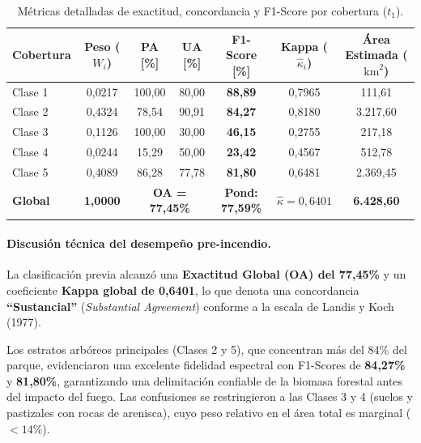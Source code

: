 \documentclass[12pt]{article}
\begin{document}
\begin{table}[H]
    \centering
    \caption{Métricas detalladas de exactitud, concordancia y F1-Score por cobertura ($t_1$).}
    \label{tab:metricas_precision_clase}
    \small
    \begin{tabular}{@{}lcccccc@{}}
        \toprule
        \textbf{Cobertura} & \textbf{Peso ($W_i$)} & \textbf{PA [\%]} & \textbf{UA [\%]} & \textbf{F1-Score [\%]} & \textbf{Kappa ($\hat{\kappa}_i$)} & \textbf{Área Estimada ($\text{km}^2$)} \\
        \midrule
        Clase 1 & 0{,}0217 & 100{,}00 & 80{,}00 & \textbf{88{,}89} & 0{,}7965 & 111{,}61 \\
        Clase 2 & 0{,}4324 & 78{,}54 & 90{,}91 & \textbf{84{,}27} & 0{,}8180 & 3.217{,}60 \\
        Clase 3 & 0{,}1126 & 100{,}00 & 30{,}00 & \textbf{46{,}15} & 0{,}2755 & 217{,}18 \\
        Clase 4 & 0{,}0244 & 15{,}29 & 50{,}00 & \textbf{23{,}42} & 0{,}4567 & 512{,}78 \\
        Clase 5 & 0{,}4089 & 86{,}28 & 77{,}78 & \textbf{81{,}80} & 0{,}6481 & 2.369{,}45 \\
        \midrule
        \textbf{Global} & \textbf{1{,}0000} & \multicolumn{2}{c}{\textbf{OA = 77{,}45\%}} & \textbf{Pond: 77{,}59\%} & \textbf{$\hat{\kappa} = 0{,}6401$} & \textbf{6.428{,}60} \\
        \bottomrule
    \end{tabular}
\end{table}

\paragraph{Discusión técnica del desempeño pre-incendio.}
La clasificación previa alcanzó una \textbf{Exactitud Global (OA) del 77,45\%} y un coeficiente \textbf{Kappa global de 0,6401}, lo que denota una concordancia \textbf{``Sustancial''} (\textit{Substantial Agreement}) conforme a la escala de Landis y Koch (1977). 

Los estratos arbóreos principales (Clases 2 y 5), que concentran más del 84\% del parque, evidenciaron una excelente fidelidad espectral con F1-Scores de \textbf{84,27\%} y \textbf{81,80\%}, garantizando una delimitación confiable de la biomasa forestal antes del impacto del fuego. Las confusiones se restringieron a las Clases 3 y 4 (suelos y pastizales con rocas de arenisca), cuyo peso relativo en el área total es marginal ($< 14\%$).
\end{document}

